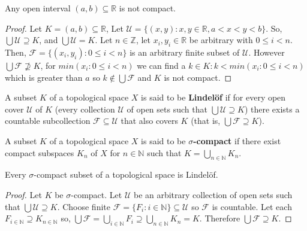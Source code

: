 \documentclass{article}
\begin{document}
	\begin{proposition}
	  Any open interval \((a,b)\subseteq\mathbb R\) is not compact.
	\end{proposition}
	\begin{proof}
	Let $K = (a, b) \subseteq \mathbb{R}$, Let $\mathcal{U} = \lbrace (x, y) : x, y \in \mathbb{R}, a < x < y < b \rbrace$. So, $\bigcup \mathcal{U} \supseteq K$, and $\bigcup \mathcal{U} = K$. Let $n \in \mathbb{Z}$, let $x_i, y_i \in \mathbb{R}$ be arbitrary with $0 \leq i < n$. Then, $\mathcal{F} = \lbrace (x_i, y_i) : 0 \leq i < n \rbrace$ is an arbitrary finite subset of $\mathcal{U}$. However $\bigcup \mathcal{F} \not\supseteq K$, for $min(x_i : 0 \leq i < n)$ we can find a $k \in K : k < min(x_i : 0 \leq i < n)$ which is greater than $a$ so $k \not\in \bigcup \mathcal{F}$ and $K$ is not compact.
	\end{proof}

	\begin{definition}
	  A subset \(K\) of a topological space \(X\) is said to be \textbf{Lindel\"of} if for every
	  open cover \(\mathcal U\) of \(K\) (every collection \(\mathcal U\) of open sets
	  such that \(\bigcup \mathcal U\supseteq K\)) there exists a countable subcollection
	  \(\mathcal F\subseteq \mathcal U\) that also covers \(K\) (that is,
	  \(\bigcup\mathcal F\supseteq K\)).
	\end{definition}

	\begin{definition}
	  A subset \(K\) of a topological space \(X\) is said to be \textbf{\(\sigma\)-compact} if
	  there exist compact subspaces \(K_n\) of \(X\) for \(n\in\mathbb N\) such that
	  \(K=\bigcup_{n\in\mathbb N} K_n\).
	  \newline \newline
	\end{definition}
	\begin{theorem}
		Every \(\sigma\)-compact subset of a topological space is Lindel\"of.
	\end{theorem}
	\begin{proof}
	Let $K$ be \(\sigma\)-compact. Let $\mathcal{U}$ be an arbitrary collection of open sets such that $\bigcup \mathcal{U} \supseteq K$. Choose finite $\mathcal{F} = \lbrace F_i : i \in \mathbb{N} \rbrace \subseteq \mathcal{U}$ so $\mathcal{F}$ is countable. Let each $F_{i \in \mathbb{N}} \supseteq K_{n \in \mathbb{N}}$ so, $\bigcup \mathcal{F} = \bigcup_{i \in \mathbb{N}} F_i \supseteq \bigcup_{n \in \mathbb{N}} K_n = K$. Therefore $\bigcup \mathcal{F} \supseteq K$.
	
	\end{proof}
\end{document}
